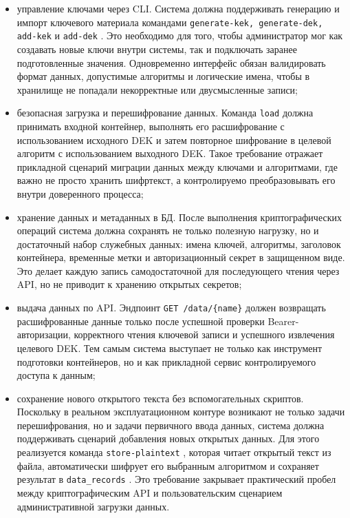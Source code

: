 \documentclass[14pt, a4paper]{extarticle}
\renewcommand{\texttt}[1]{%
  {\def\UrlFont{\ttfamily}\nolinkurl{#1}}%
}
\begin{document}
	\begin{itemize}
	\item управление ключами через CLI. Система должна поддерживать генерацию и импорт ключевого материала командами \texttt{generate-kek, generate-dek, add-kek} и \texttt{add-dek}. Это необходимо для того, чтобы администратор мог как создавать новые ключи внутри системы, так и подключать заранее подготовленные значения. Одновременно интерфейс обязан валидировать формат данных, допустимые алгоритмы и логические имена, чтобы в хранилище не попадали некорректные или двусмысленные записи;
	\item безопасная загрузка и перешифрование данных. Команда \texttt{load} должна принимать входной контейнер, выполнять его расшифрование с использованием исходного DEK и затем повторное шифрование в целевой алгоритм с использованием выходного DEK. Такое требование отражает прикладной сценарий миграции данных между ключами и алгоритмами, где важно не просто хранить шифртекст, а контролируемо преобразовывать его внутри доверенного процесса;
	\item хранение данных и метаданных в БД. После выполнения криптографических операций система должна сохранять не только полезную нагрузку, но и достаточный набор служебных данных: имена ключей, алгоритмы, заголовок контейнера, временные метки и авторизационный секрет в защищенном виде. Это делает каждую запись самодостаточной для последующего чтения через API, но не приводит к хранению открытых секретов;
	\item выдача данных по API. Эндпоинт \texttt{GET /data/{name}} должен возвращать расшифрованные данные только после успешной проверки Bearer-авторизации, корректного чтения ключевой записи и успешного извлечения целевого DEK. Тем самым система выступает не только как инструмент подготовки контейнеров, но и как прикладной сервис контролируемого доступа к данным;
	\item сохранение нового открытого текста без вспомогательных скриптов. Поскольку в реальном эксплуатационном контуре возникают не только задачи перешифрования, но и задачи первичного ввода данных, система должна поддерживать сценарий добавления новых открытых данных. Для этого реализуется команда \texttt{store-plaintext}, которая читает открытый текст из файла, автоматически шифрует его выбранным алгоритмом и сохраняет результат в \texttt{data\_records}. Это требование закрывает практический пробел между криптографическим API и пользовательским сценарием административной загрузки данных.
	\end{itemize}
	
\end{document}
